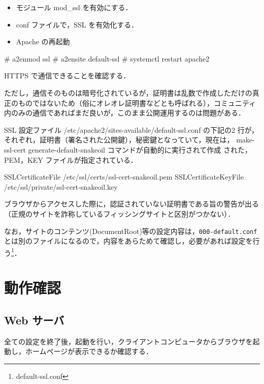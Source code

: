 \begin{itemize}
 \item モジュール mod\_ssl を有効にする．
 \item conf ファイルで，SSL を有効化する．
 \item Apache の再起動
\end{itemize}

\begin{cli}
# a2enmod ssl
# a2ensite default-ssl
# systemctl restart apache2
\end{cli}

HTTPS で通信できることを確認する．

ただし，通信そのものは暗号化されているが，証明書は乱数で作成しただけの真
正のものではないため（俗にオレオレ証明書などとも呼ばれる），コミュニティ
内のみの通信であればまだ良いが，このまま公開運用するのは問題がある．

SSL 設定ファイル /etc/apache2/sites-available/default-ssl.conf の下記の2 
行が，それぞれ，証明書（署名された公開鍵），秘密鍵となっていて，現在は，
make-ssl-cert generate-default-snakeoil コマンドが自動的に実行されて作成
された，PEM，KEY ファイルが指定されている．

\begin{cli}
 SSLCertificateFile /etc/ssl/certs/ssl-cert-snakeoil.pem
 SSLCertificateKeyFile /etc/ssl/private/ssl-cert-snakeoil.key
\end{cli}

ブラウザからアクセスした際に，認証されていない証明書である旨の警告が出る
（正規のサイトを詐称しているフィッシングサイトと区別がつかない）．

なお，サイトのコンテンツ(DocumentRoot)等の設定内容は，\texttt{000-default.conf}とは別のファイルになるので，内容をあらためて確認し，必要があれば設定を行う\footnote{default-ssl.conf}．


\section{動作確認}

\subsection*{Web サーバ}

全ての設定を終了後，起動を行い，クライアントコンピュータからブラウザを起
動し，ホームページが表示できるか確認する．

